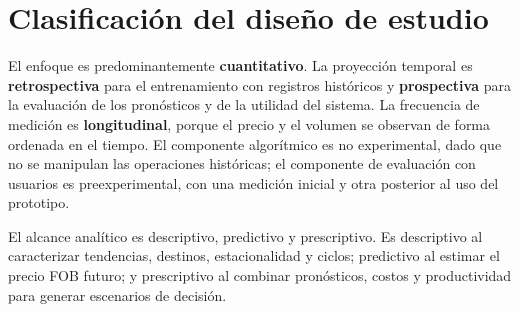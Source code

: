 \section{Clasificación del diseño de estudio}

El enfoque es predominantemente \textbf{cuantitativo}. La proyección temporal es \textbf{retrospectiva} para el entrenamiento con registros históricos y \textbf{prospectiva} para la evaluación de los pronósticos y de la utilidad del sistema. La frecuencia de medición es \textbf{longitudinal}, porque el precio y el volumen se observan de forma ordenada en el tiempo. El componente algorítmico es no experimental, dado que no se manipulan las operaciones históricas; el componente de evaluación con usuarios es preexperimental, con una medición inicial y otra posterior al uso del prototipo.

El alcance analítico es descriptivo, predictivo y prescriptivo. Es descriptivo al caracterizar tendencias, destinos, estacionalidad y ciclos; predictivo al estimar el precio FOB futuro; y prescriptivo al combinar pronósticos, costos y productividad para generar escenarios de decisión.
